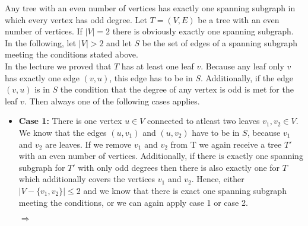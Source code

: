 \documentclass[a4paper]{article}
\begin{document}
\begin{solution}{6}
		\begin{theorem}{Any tree with an even number of vertices has exactly one spanning subgraph in which every vertex has odd degree.}
			Let $T=(V, E)$ be a tree with an even number of vertices. If $|V|=2$ there is obviously exactly one spanning subgraph. 
			In the following, let $|V|>2$ and let $S$ be the set of edges of a spanning subgraph meeting the conditions stated above. \\
			In the lecture we proved that $T$ has at least one leaf $v$. 
			Because any leaf only $v$ has exactly one edge $(v,u)$, this edge has to be in $S$. 
			Additionally, if the edge $(v,u)$ is in $S$ the condition that the degree of any vertex is odd is met for the leaf $v$. 
			Then always one of the following cases applies. 
			\begin{itemize}
				\item \textbf{Case 1:} There is one vertex $u \in V$ connected to atleast two leaves $v_1, v_2 \in V$. \\
				We know that the edges $(u,v_1)$ and $(u,v_2)$ have to be in $S$, because $v_1$ and $v_2$ are leaves. 
				If we remove $v_1$ and $v_2$ from T we again receive a tree $T'$ with an even number of vertices. 
				Additionally, if there is exactly one spanning subgraph for $T'$ with only odd degrees then there is also exactly one for $T$ which additionally covers the vertices $v_1$ and $v_2$. 
				Hence, either $|V- \{v_1,v_2\}| \leq 2$ and we know that there is exact one spanning subgraph meeting the conditions, or we can again apply case 1 or case 2. 
				
				\begin{center}
				 $\Rightarrow$
			\end{center}
			

\end{itemize}
\end{theorem}
\end{solution}
\end{document}
